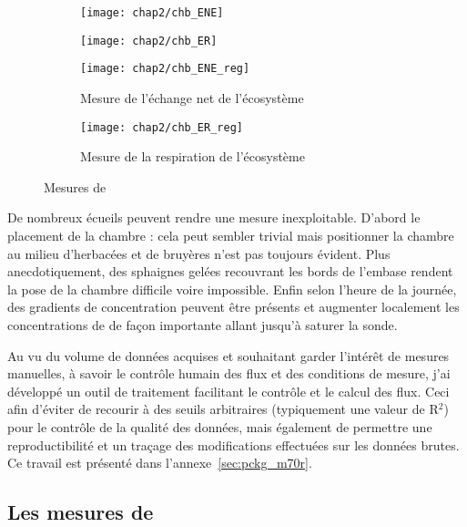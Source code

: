 \begin{figure}
	\centering
	\begin{subfigure}[t]{0.5\textwidth}
		\centering
		\texttt{[image: chap2/chb\_ENE]}
	\end{subfigure}%
	\begin{subfigure}[t]{0.5\textwidth}
		\centering
		\texttt{[image: chap2/chb\_ER]}
	\end{subfigure}%

	\begin{subfigure}[t]{0.5\textwidth}
		\texttt{[image: chap2/chb\_ENE\_reg]}
		\caption{Mesure de l'échange net de l'écosystème}
	\end{subfigure}%
	\begin{subfigure}[t]{0.5\textwidth}
		\texttt{[image: chap2/chb\_ER\_reg]}
		\caption{Mesure de la respiration de l'écosystème}
	\end{subfigure}
\caption{Mesures de \coo}
\label{fig:chb}
\end{figure}


De nombreux écueils peuvent rendre une mesure inexploitable. D'abord le placement de la chambre : cela peut sembler trivial mais positionner la chambre au milieu d'herbacées et de bruyères n'est pas toujours évident. 
Plus anecdotiquement, des sphaignes gelées recouvrant les bords de l'embase rendent la pose de la chambre difficile voire impossible. 
Enfin selon l'heure de la journée, des gradients de concentration peuvent être présents et augmenter localement les concentrations de \coo de façon importante allant jusqu'à saturer la sonde.

Au vu du volume de données acquises et souhaitant garder l'intérêt de mesures manuelles, à savoir le contrôle humain des flux et des conditions de mesure, j'ai développé un outil de traitement facilitant le contrôle et le calcul des flux.
Ceci afin d'éviter de recourir à des seuils arbitraires (typiquement une valeur de R$^{2}$) pour le contrôle de la qualité des données, mais également de permettre une reproductibilité et un traçage des modifications effectuées sur les données brutes.
Ce travail est présenté dans l'annexe~\ref{sec:pckg_m70r}.

\subsection{Les mesures de \texorpdfstring{\chh}{CH4}}

